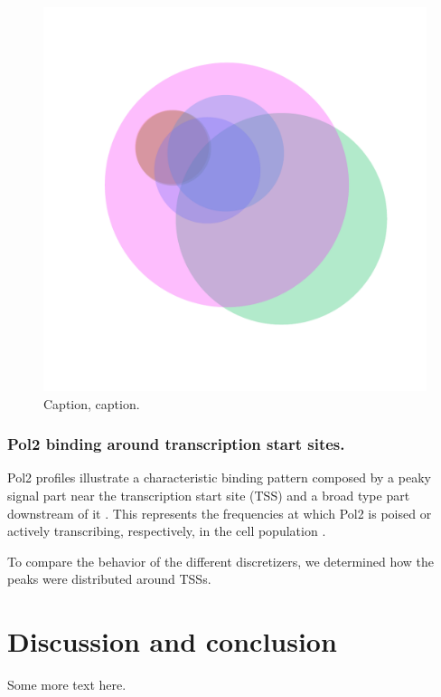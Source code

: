 \documentclass{bioinfo}
\begin{document}
\begin{figure}[!tpb]
    \centerline{\includegraphics[scale=0.5]{histone_venn_color.pdf}}
\caption{Caption, caption.}\label{fig:venn}
\end{figure}

\subsubsection{Pol2 binding around transcription start sites.}
Pol2 profiles illustrate a characteristic binding pattern composed by a peaky
signal part near the transcription start site (TSS) and a broad type part
downstream of it \citep{pmid}. This represents the frequencies
at which Pol2 is poised or actively transcribing, respectively,
in the cell population \citep{pmid}.

To compare the behavior of the different discretizers, we determined how the
peaks were distributed around TSSs.



\section{Discussion and conclusion}
Some more text here.
\end{document}
